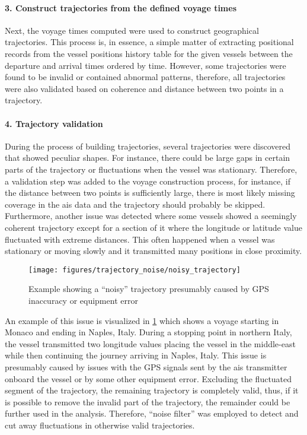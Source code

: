 \paragraph{3. Construct trajectories from the defined voyage times}

Next, the voyage times computed were used to construct geographical trajectories. This process is, in essence, a simple matter of extracting positional records from the vessel positions history table for the given vessels between the departure and arrival times ordered by time. However, some trajectories were found to be invalid or contained abnormal patterns, therefore, all trajectories were also validated based on coherence and distance between two points in a trajectory.

\paragraph{4. Trajectory validation}

During the process of building trajectories, several trajectories were discovered that showed peculiar shapes. For instance, there could be large gaps in certain parts of the trajectory or fluctuations when the vessel was stationary. Therefore, a validation step was added to the voyage construction process, for instance, if the distance between two points is sufficiently large, there is most likely missing coverage in the \acrshort{ais} data and the trajectory should probably be skipped. Furthermore, another issue was detected where some vessels showed a seemingly coherent trajectory except for a section of it where the longitude or latitude value fluctuated with extreme distances. This often happened when a vessel was stationary or moving slowly and it transmitted many positions in close proximity.

\begin{figure}[htbp]  %
    \centering
    \texttt{[image: figures/trajectory\_noise/noisy\_trajectory]}
    \caption{Example showing a ``noisy'' trajectory presumably caused by GPS inaccuracy or equipment error}
    \label{fig:noisy_trajectory}
\end{figure}

An example of this issue is visualized in \cref{fig:noisy_trajectory} which shows a voyage starting in Monaco and ending in Naples, Italy. During a stopping point in northern Italy, the vessel transmitted two longitude values placing the vessel in the middle-east while then continuing the journey arriving in Naples, Italy. This issue is presumably caused by issues with the GPS signals sent by the \acrshort{ais} transmitter onboard the vessel or by some other equipment error. Excluding the fluctuated segment of the trajectory, the remaining trajectory is completely valid, thus, if it is possible to remove the invalid part of the trajectory, the remainder could be further used in the analysis. Therefore, ``noise filter'' was employed to detect and cut away fluctuations in otherwise valid trajectories.

